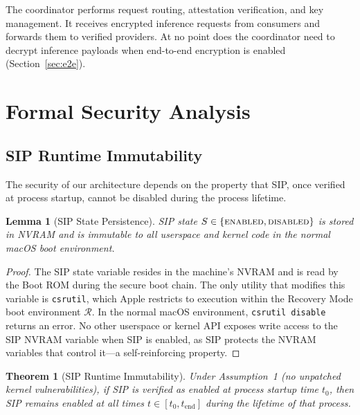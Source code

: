 \documentclass[10pt,twocolumn,letterpaper]{article}
\newtheorem{theorem}{Theorem}
\newtheorem{lemma}{Lemma}
\begin{document}
The coordinator performs request routing, attestation verification, and key management. It receives encrypted inference requests from consumers and forwards them to verified providers. At no point does the coordinator need to decrypt inference payloads when end-to-end encryption is enabled (Section~\ref{sec:e2e}).

\section{Formal Security Analysis}
\label{sec:formal}

\subsection{SIP Runtime Immutability}
\label{sec:sip}

The security of our architecture depends on the property that SIP, once verified at process startup, cannot be disabled during the process lifetime.

\begin{lemma}[SIP State Persistence]
\label{lem:sip-nvram}
SIP state $S \in \{\textsc{enabled}, \textsc{disabled}\}$ is stored in NVRAM and is immutable to all userspace and kernel code in the normal macOS boot environment.
\end{lemma}

\begin{proof}
The SIP state variable resides in the machine's NVRAM and is read by the Boot ROM during the secure boot chain. The only utility that modifies this variable is \texttt{csrutil}, which Apple restricts to execution within the Recovery Mode boot environment $\mathcal{R}$. In the normal macOS environment, \texttt{csrutil disable} returns an error. No other userspace or kernel API exposes write access to the SIP NVRAM variable when SIP is enabled, as SIP protects the NVRAM variables that control it---a self-reinforcing property.
\end{proof}

\begin{theorem}[SIP Runtime Immutability]
\label{thm:sip}
Under Assumption~1 (no unpatched kernel vulnerabilities), if SIP is verified as enabled at process startup time $t_0$, then SIP remains enabled at all times $t \in [t_0, t_{\text{end}}]$ during the lifetime of that process.
\end{theorem}
\end{document}
